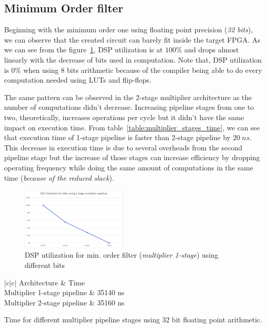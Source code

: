\subsection{Minimum Order filter}
Beginning with the minimum order one using floating point precision (\textit{32 bits}), we can observe that the created circuit can barely fit inside the target FPGA. As we can see from the figure~\ref{fig:fir_min_dsp_util}, DSP utilization is at $100\%$ and drops almost linearly with the decrease of bits used in computation. Note that, DSP utilization is $0\%$ when using 8 bits arithmetic because of the compiler being able to do every computation needed using LUTs and flip-flops.

The same pattern can be observed in the 2-stage multiplier architecture as the number of computations didn't decrease. Increasing pipeline stages from one to two, theoretically, increases operations per cycle but it didn't have the same impact on execution time. From table~\ref{table:multiplier_stages_time}, we can see that execution time of 1-stage pipeline is faster than 2-stage pipeline by $20\hspace{3pt}ns$. This decrease in execution time is due to several overheads from the second pipeline stage but the increase of those stages can increase efficiency by dropping operating frequency while doing the same amount of computations in the same time (\textit{because of the reduced slack}).

\begin{figure}[htbp]
	\centering
	\includegraphics[width=0.45\textwidth]{../Images/FIR_min_Order/multiplier_1_pipeline/dsp_util.png}
	\caption{DSP utilization for min. order filter (\textit{multiplier 1-stage}) using different bits}
	\label{fig:fir_min_dsp_util}
\end{figure}

\begin{table}[htbp]
\centering
\begin{tblr}{|c|c|}
	\hline
	Architecture & Time \\
	\hline
	{Multiplier 1-stage pipeline} & 35140 ns\\
	\hline
	{Multiplier 2-stage pipeline} & 35160 ns\\
	\hline
\end{tblr}
\caption{Time for different multiplier pipeline stages using 32 bit floating point arithmetic.}
\label{table:multiplier_stages_time}
\end{table}

